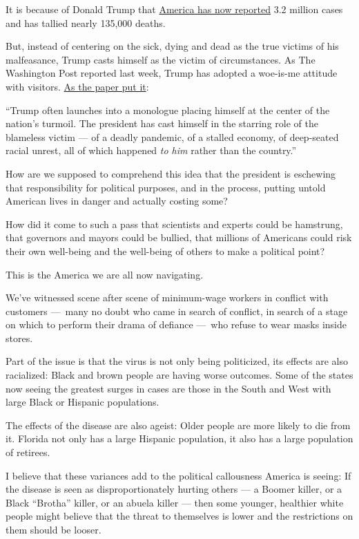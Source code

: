 It is because of Donald Trump that
\href{https://www.cdc.gov/coronavirus/2019-ncov/cases-updates/us-cases-deaths.html}{America
has now reported} 3.2 million cases and has tallied nearly 135,000
deaths.

But, instead of centering on the sick, dying and dead as the true
victims of his malfeasance, Trump casts himself as the victim of
circumstances. As The Washington Post reported last week, Trump has
adopted a woe-is-me attitude with visitors.
\href{https://www.washingtonpost.com/politics/trump-the-victim-president-complains-in-private-about-the-pandemic-hurting-himself/2020/07/09/187142c6-c089-11ea-864a-0dd31b9d6917_story.html}{As
the paper put it}:

``Trump often launches into a monologue placing himself at the center of
the nation's turmoil. The president has cast himself in the starring
role of the blameless victim --- of a deadly pandemic, of a stalled
economy, of deep-seated racial unrest, all of which happened \emph{to
him} rather than the country.''

How are we supposed to comprehend this idea that the president is
eschewing that responsibility for political purposes, and in the
process, putting untold American lives in danger and actually costing
some?

How did it come to such a pass that scientists and experts could be
hamstrung, that governors and mayors could be bullied, that millions of
Americans could risk their own well-being and the well-being of others
to make a political point?

This is the America we are all now navigating.

We've witnessed scene after scene of minimum-wage workers in conflict
with customers ---~many no doubt who came in search of conflict, in
search of a stage on which to perform their drama of defiance ---~who
refuse to wear masks inside stores.

Part of the issue is that the virus is not only being politicized, its
effects are also racialized: Black and brown people are having worse
outcomes. Some of the states now seeing the greatest surges in cases are
those in the South and West with large Black or Hispanic populations.

The effects of the disease are also ageist: Older people are more likely
to die from it. Florida not only has a large Hispanic population, it
also has a large population of retirees.

I believe that these variances add to the political callousness America
is seeing: If the disease is seen as disproportionately hurting others
--- a Boomer killer, or a Black ``Brotha'' killer, or an abuela killer
--- then some younger, healthier white people might believe that the
threat to themselves is lower and the restrictions on them should be
looser.

